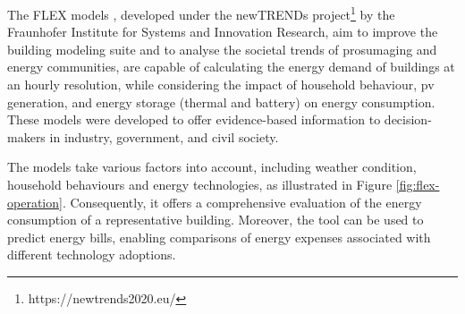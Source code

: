 The FLEX models \cite{newtrends}, developed under the newTRENDs project\footnote{https://newtrends2020.eu/} by the Fraunhofer Institute for Systems and Innovation Research, 
aim to improve the building modeling suite and to analyse the societal trends of prosumaging and energy communities, 
are capable of calculating the energy demand of buildings at an hourly resolution,
while considering the impact of household behaviour, \gls{pv} generation, and energy storage (thermal and battery) on energy consumption. 
These models were developed to offer evidence-based information to decision-makers in industry, government, and civil society. 

The models take various factors into account, including weather condition, household behaviours and energy technologies, as illustrated in Figure \ref{fig:flex-operation}.
Consequently, it offers a comprehensive evaluation of the energy consumption of a representative building. 
Moreover, the tool can be used to predict energy bills, enabling comparisons of energy expenses associated with different technology adoptions. 



